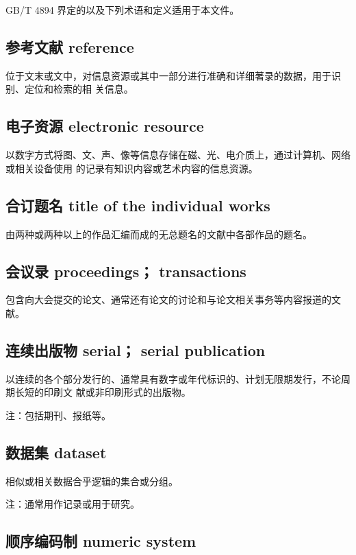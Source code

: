 \documentclass[twoside]{article}%
\begin{document}
{
\renewcommand\addcontentsline[3]{}
GB/T 4894 界定的以及下列术语和定义适用于本文件。

\subsection{参考文献 reference}
位于文末或文中，对信息资源或其中一部分进行准确和详细著录的数据，用于识别、定位和检索的相
关信息。

\subsection{电子资源 electronic resource}
以数字方式将图、文、声、像等信息存储在磁、光、电介质上，通过计算机、网络或相关设备使用
的记录有知识内容或艺术内容的信息资源。

\subsection{合订题名 title of the individual works}
由两种或两种以上的作品汇编而成的无总题名的文献中各部作品的题名。

\subsection{会议录 proceedings； transactions}
包含向大会提交的论文、通常还有论文的讨论和与论文相关事务等内容报道的文献。


\subsection{连续出版物 serial； serial publication}\label{sec:concept:serial}
以连续的各个部分发行的、通常具有数字或年代标识的、计划无限期发行，不论周期长短的印刷文
献或非印刷形式的出版物。

\mbox{}{\small 注：包括期刊、报纸等。\par}


\subsection{数据集 dataset}
相似或相关数据合乎逻辑的集合或分组。

\mbox{}{\small 注：通常用作记录或用于研究。\par}

\subsection{顺序编码制 numeric system}

}
\end{document}
